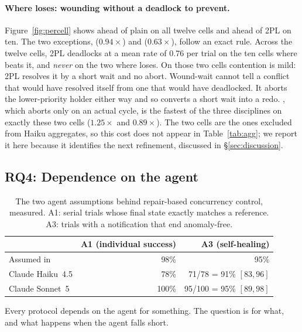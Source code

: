 \paragraph{Where \ccs loses: wounding without a deadlock to prevent.}
Figure~\ref{fig:percell} shows \ccs ahead of plain \cc on all twelve cells and
ahead of 2PL on ten. The two exceptions, 
($0.94\times$) and  ($0.63\times$), follow an exact
rule. Across the twelve cells, 2PL deadlocks at a mean rate of 0.76 per trial
on the ten cells where \ccs beats it, and \emph{never} on the two where \ccs
loses. On those two cells contention is mild: 2PL resolves it by a short wait
and no abort. Wound-wait cannot tell a conflict that would have resolved
itself from one that would have deadlocked. It aborts the lower-priority
holder either way and so converts a short wait into a redo. \cctwo, which
aborts only on an actual cycle, is the fastest of the three disciplines on
exactly these two cells ($1.25\times$ and $0.89\times$). The two cells are the ones excluded
from Haiku aggregates, so this cost does not appear in Table~\ref{tab:agg}; we
report it here because it identifies the next refinement, discussed in
\S\ref{sec:discussion}.

\subsection{RQ4: Dependence on the agent}
\label{sec:eval:agent}

\begin{table}[t]
\caption{The two agent assumptions behind repair-based concurrency control,
measured. A1: serial trials whose final state exactly matches a reference.
A3: \mtpo trials with a notification that end anomaly-free.}
\label{tab:assump}
\small
\begin{tabular}{@{}lrr@{}}
\toprule
 & A1 (individual success) & A3 (self-healing) \\
\midrule
Assumed in~\cite{lyu2026coagent} & 98\% & 95\% \\
Claude Haiku~4.5 & 78\% & 71/78 = 91\% $[83, 96]$ \\
Claude Sonnet~5  & 100\% & 95/100 = 95\% $[89, 98]$ \\
\bottomrule
\end{tabular}
\end{table}

Every protocol depends on the agent for something. The question is for what,
and what happens when the agent falls short.


